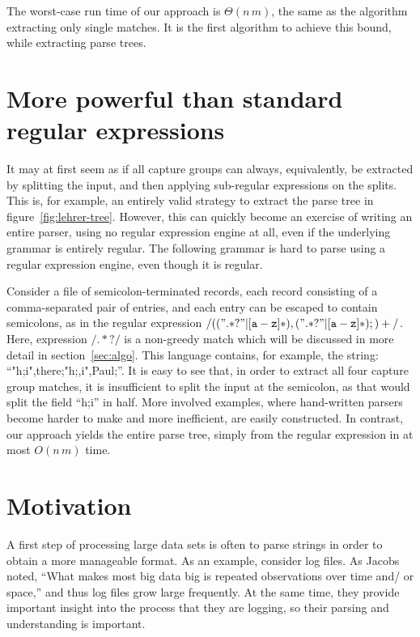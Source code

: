 \documentclass[11pt,a4paper,twoside,openright]{Thesis}
\theoremstyle{definition}
\newcommand{\regex}[1]{\ensuremath{\mathtt{/#1/}}}
\newcommand{\Figref}[1]{figure~\ref{fig:#1}}
\newcommand{\Secref}[1]{section~\ref{sec:#1}}
\newcommand{\seclabel}[1]{\label{sec:#1}}
\begin{document}
The worst-case run time of our approach is $\Theta(n\,m)$, the same as the
algorithm extracting only single matches. It is the first algorithm to achieve
this bound, while extracting parse trees.

\section{More powerful than standard regular expressions}
\seclabel{power}
It may at first seem as if all capture groups can always, equivalently,
be extracted by splitting the input, and then applying sub-regular
expressions on the splits.  This is, for example, an entirely valid
strategy to extract the parse tree in \Figref{lehrer-tree}.  However,
this can quickly become an exercise of writing an entire parser,
using no regular expression engine at all, even if the underlying
grammar is entirely regular.  The following grammar is hard to parse
using a regular expression engine, even though it is regular.

Consider a file of semicolon-terminated records, each record consisting
of a comma-separated pair of entries, and each entry can be escaped
to contain semicolons, as in the regular expression
\regex{((".*?"|[a-z]*),(".*?"|[a-z]*);)+}. Here, expression
\regex{.*?} is a non-greedy match which will be discussed in more
detail in \Secref{algo}.  This language contains, for example, the
string: ``"h;i",there;"h;,i",Paul;''.  It is easy to see that, in
order to extract all four capture group matches, it is insufficient
to split the input at the semicolon, as that would split the field
``h;i'' in half.  More involved examples, where hand-written parsers
become harder to make and more inefficient, are easily constructed.
In contrast, our approach yields the entire parse tree, simply from
the regular expression in at most $O(n\,m)$ time.

\section{Motivation}

A first step of processing large data sets is often to parse strings in order
to obtain a more manageable format. As an example, consider log files.  As
Jacobs\cite{Jaco09a} noted, ``What makes most big data big is repeated
observations over time and/ or space,'' and thus log files grow large
frequently. At the same time, they provide important insight into the process
that they are logging, so their parsing and understanding is important.
\end{document}
